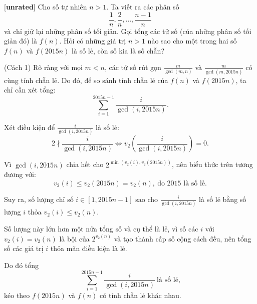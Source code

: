 \documentclass[../06-largest-exponent.tex]{subfiles}
\begin{document}
\begin{example*}\label{example:RUS-2015-MO-11-P2}[\textbf{unrated}]
	Cho số tự nhiên $n > 1$. Ta viết ra các phân số
	\[
	\frac{1}{n}, \frac{2}{n}, \dots, \frac{n-1}{n}
	\]
	và chỉ giữ lại những phân số tối giản. Gọi tổng các tử số (của những phân số tối giản đó) là $f(n)$.
	Hỏi có những giá trị $n > 1$ nào sao cho một trong hai số $f(n)$ và $f(2015n)$ là số lẻ, còn số kia là số chẵn?
\end{example*}

\begin{soln}(Cách 1)\footnotemark
	Rõ ràng với mọi $m < n$, các tử số rút gọn $\frac{m}{\gcd(m,n)}$ và $\frac{m}{\gcd(m,2015n)}$ có cùng tính chẵn lẻ.
	Do đó, để so sánh tính chẵn lẻ của $f(n)$ và $f(2015n)$, ta chỉ cần xét tổng:
	\[
		\sum_{i=1}^{2015n - 1} \frac{i}{\gcd(i, 2015n)}.
	\]
	
	Xét điều kiện để $\frac{i}{\gcd(i, 2015n)}$ là số lẻ:
	\[
		2 \nmid \frac{i}{\gcd(i, 2015n)} \iff v_2\left(\frac{i}{\gcd(i, 2015n)}\right) = 0.
	\]
	
	Vì $\gcd(i, 2015n)$ chia hết cho $2^{\min(v_2(i), v_2(2015n))}$, nên biểu thức trên tương đương với:
	\[
		v_2(i) \le v_2(2015n) = v_2(n),\ \text{do 2015 là số lẻ.}
	\]
	
	Suy ra, số lượng chỉ số $i \in [1, 2015n-1]$ sao cho $\frac{i}{\gcd(i,2015n)}$ là số lẻ bằng số lượng $i$ thỏa $v_2(i) \le v_2(n)$.
	
	Số lượng này lớn hơn một nửa tổng số và cụ thể là lẻ, vì số các $i$ với $v_2(i) = v_2(n)$ là bội của $2^{v_2(n)}$ và tạo thành cấp số cộng cách đều,
	nên tổng số các giá trị $i$ thỏa mãn điều kiện là lẻ.
	
	Do đó tổng
	\[
		\sum_{i=1}^{2015n - 1} \frac{i}{\gcd(i, 2015n)}\ \text{là số lẻ,}
	\]
	kéo theo $f(2015n)$ và $f(n)$ có tính chẵn lẻ khác nhau.
\end{soln}


\newpage
\end{document}

